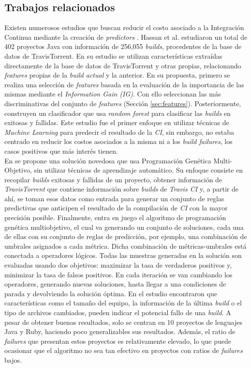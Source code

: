 \subsection{Trabajos relacionados}
Existen numerosos estudios que buscan reducir el costo asociado a la Integración Continua
mediante la creación de \textit{predictors} \cite{7,5,2,15,6,14,4,1,19}. Hassan et al. \cite{7}
estudiaron un total de 402 proyectos Java con información de 256,055 \textit{builds}, procedentes
de la base de datos de TravisTorrent. En su estudio se utilizan características extraídas
directamente de la base de datos de TravisTorrent y otras propias, relacionando \textit{features}
propias de la \textit{build actual} y la anterior. En su propuesta, primero se realiza una
selección de \textit{features} basada en la evaluación de la importancia de las mismas mediante
el \textit{Information Gain (IG)}. Con ello seleccionan las más discriminativas del conjunto de
\textit{features} (Sección \ref{sec:features}). Posteriormente, construyen un clasificador que usa
\textit{random forest} para clasificar las \textit{builds} en exitosas y fallidas. Este estudio
fue el primer enfoque en utilizar técnicas de \textit{Machine Learning} para predecir el resultado
de la \textit{CI}, sin embargo, no estaba centrado en reducir los costos asociados a la misma ni
a los \textit{build failures}, los casos positivos que más interés tienen.\\

En \cite{5} se propone una solución novedosa que usa Programación Genética Multi-Objetivo, sin
utilizar técnicas de aprendizaje automático. Su enfoque consiste en recopilar \textit{builds}
exitosas y fallidas de un proyecto, obtener información de \textit{TravisTorrent} que contiene
información sobre \textit{builds} de \textit{Travis CI} y, a partir de ahí, se toman esos datos
como entrada para generar un conjunto de reglas predictivas que anticipen el resultado de la
compilación de \textit{CI} con la mayor precisión posible. Finalmente, entra en juego el 
algoritmo de programación genética multiobjetivo, el cual va generando un conjunto de soluciones, 
cada una de ellas con su conjunto de reglas de predicción, por ejemplo, una combinación de
umbrales asignados a cada métrica. Dicha combinación de métricas-umbrales está conectada a
operadores lógicos. Todas las muestras generadas en la solución son evaluadas usando dos
objetivos: maximizar la tasa de verdaderos positivos y, minimizar la tasa de falsos positivos.
En cada iteración se van cambiando los operadores, generando nuevas soluciones, hasta llegar a
una condiciones de parada y devolviendo la solución óptima. En el estudio encontraron que
características como el tamaño del equipo, la información de la última \textit{build} o el tipo
de archivos cambiados, pueden indicar el potencial fallo de una \textit{build}. A pesar de
obtener buenos resultados, solo se centran en 10 proyectos de lenguajes Java y Ruby, haciendo
poco generalizables sus resultados. Además, el ratio de \textit{failures} que presentan estos
proyectos es relativamente elevado, lo que puede ocasionar que el algoritmo no sea tan efectivo
en proyectos con ratios de \textit{failures} bajos.\\

